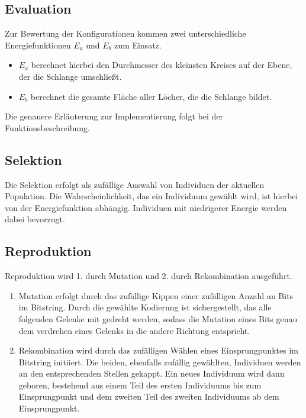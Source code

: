 \documentclass[parskip=half,paper=a4]{scrartcl}
\begin{document}
  \subsection{Evaluation}
    Zur Bewertung der Konfigurationen kommen zwei unterschiedliche
    Energiefunktionen $E_a$ und $E_b$ zum Einsatz.
    \begin{itemize}
    \item $E_a$ berechnet hierbei den Durchmesser des kleinsten Kreises auf der
      Ebene, der die Schlange umschließt.
    \item $E_b$ berechnet die gesamte Fläche aller Löcher, die die Schlange bildet.
    \end{itemize}
    Die genauere Erläuterung zur Implementierung folgt bei der Funktionsbeschreibung.
    
  \subsection{Selektion}
    Die Selektion erfolgt als zufällige Auswahl von Individuen der aktuellen
    Population. Die Wahrscheinlichkeit, das ein Individuum gewählt wird, ist
    hierbei von der Energiefunktion abhängig. Individuen mit niedrigerer Energie
    werden dabei bevorzugt.
    
  \subsection{Reproduktion}
    Reproduktion wird 1. durch Mutation und 2. durch Rekombination ausgeführt.
    
    \begin{enumerate}
      \item Mutation erfolgt durch das zufällige Kippen einer zufälligen Anzahl an
        Bits im Bitstring. Durch die gewählte Kodierung ist sichergestellt, das
        alle folgenden Gelenke mit gedreht werden, sodass die Mutation eines Bits
        genau dem verdrehen eines Gelenks in die andere Richtung entspricht.
      \item Rekombination wird durch das zufälligen Wählen eines Einsprungpunktes
        im Bitstring initiiert. Die beiden, ebenfalls zufällig gewählten,
        Individuen werden an den entsprechenden Stellen gekappt. Ein neues
        Individuum wird dann geboren, bestehend aus einem Teil des ersten
        Individuums bis zum Einsprungpunkt und dem zweiten Teil des
        zweiten Individuums ab dem Einsprungpunkt.
    \end{enumerate}
    
\end{document}

